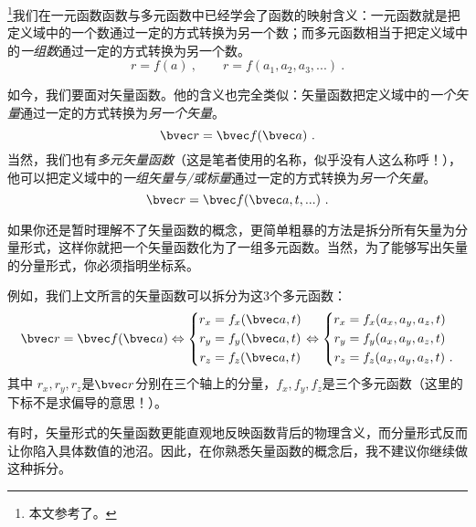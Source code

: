 
\begin{issues}
\end{issues}


\footnote{本文参考了\cite{Thomas}。}我们在一元函数函数与多元函数中已经学会了函数的映射含义：一元函数就是把定义域中的一个数通过一定的方式转换为另一个数；而多元函数相当于把定义域中的\textsl{一组数}通过一定的方式转换为另一个数。
$$
r=f(a)~, \qquad r=f(a_1, a_2, a_3,...)~.
$$

如今，我们要面对矢量函数。他的含义也完全类似：矢量函数把定义域中的\textsl{一个矢量}通过一定的方式转换为\textsl{另一个矢量}。
$$
\bvec r = \bvec f (\bvec a)~.
$$
当然，我们也有\textsl{多元矢量函数}（这是笔者使用的名称，似乎没有人这么称呼！），他可以把定义域中的\textsl{一组矢量与/或标量}通过一定的方式转换为\textsl{另一个矢量}。
$$
\bvec r = \bvec f (\bvec a, t, ...)~.
$$

如果你还是暂时理解不了矢量函数的概念，更简单粗暴的方法是拆分所有矢量为分量形式，这样你就把一个矢量函数化为了一组多元函数。当然，为了能够写出矢量的分量形式，你必须指明坐标系。

例如，我们上文所言的矢量函数可以拆分为这$3$个多元函数：
$$
\bvec r = \bvec f (\bvec a)
\Leftrightarrow
\left \{
\begin{aligned}
r_x &= f_x(\bvec a, t)\\
r_y &= f_y(\bvec a, t)\\
r_z &= f_z(\bvec a, t)\\
\end{aligned}
\right.
\Leftrightarrow
\left \{
\begin{aligned}
r_x &= f_x(a_x,a_y,a_z,t)\\
r_y &= f_y(a_x,a_y,a_z,t)\\
r_z &= f_z(a_x,a_y,a_z,t)~.\\
\end{aligned}
\right.
$$
其中 $r_x, r_y, r_z$是$\bvec r$分别在三个轴上的分量，$f_x,f_y,f_z$是三个多元函数（这里的下标不是求偏导的意思！）。

有时，矢量形式的矢量函数更能直观地反映函数背后的物理含义，而分量形式反而让你陷入具体数值的池沼。因此，在你熟悉矢量函数的概念后，我不建议你继续做这种拆分。
